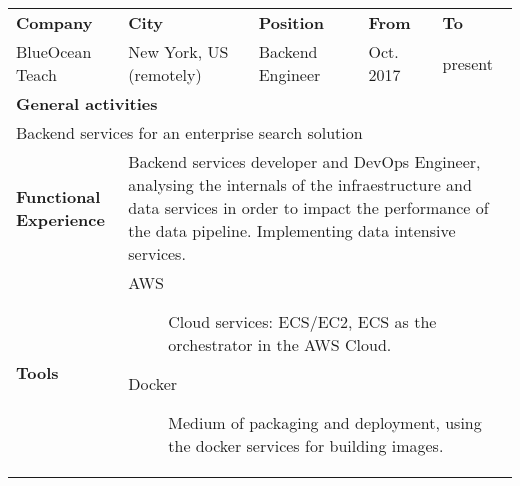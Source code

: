 


\begin{cventries}


  \begin{tabular}{|p{4.5cm} p{2cm} p{4cm} p{2cm} p{2cm}|}
    \hline
    \textbf{Company} & 
    \textbf{City} & 
    \textbf{Position} & 
    \textbf{From} & \textbf{To} \\
    BlueOcean Teach & 
    New York, US \hspace{1cm} (remotely) & 
    Backend Engineer & 
    
    Oct. 2017 & present \\ 

    \multicolumn{5}{|l|}{\textbf{General activities}} \\

     \multicolumn{5}{|p{15cm}|}{
       Backend services for an enterprise search solution
       } \\

    \textbf{Functional Experience} & \multicolumn{4}{p{12cm}|}{
     
     Backend services developer and DevOps Engineer, analysing the internals of the infraestructure and data services in order to impact the performance of the data pipeline. Implementing data intensive services.
      
      } \\

      \textbf{Tools} & \multicolumn{4}{p{12cm}|}{
                       \begin{description}
                       
                        \item[AWS] Cloud services: ECS/EC2, ECS as the orchestrator in the AWS Cloud.

                        \item[Docker] Medium of packaging and deployment, using the docker services for building images.


\end{description}}
\end{tabular}
\end{cventries}
